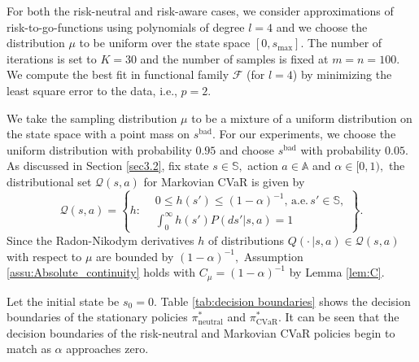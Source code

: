 \documentclass[12pt,technote,onecolumn]{IEEEtran}
\begin{document}
For both the risk-neutral and risk-aware cases, we consider approximations
of risk-to-go-functions using polynomials of degree $l=4$ and we
choose the distribution $\mu$ to be uniform over the state space
$\left[0,s_{\max}\right].$ The number of iterations is set to $K=30$
and the number of samples is fixed at $m=n=100.$ We compute the best
fit in functional family $\mathcal{F}$ (for
$l=4$) by minimizing the least square error to the data, i.e., $p=2.$

We take the sampling distribution $\mu$ to be a mixture of a uniform
distribution on the state space with a point mass on $s^{\text{bad}}$. For
our experiments, we choose the uniform distribution with probability
$0.95$ and choose $s^{\text{bad}}$ with probability $0.05$. As discussed
in Section \ref{sec3.2}, fix state $s\in\mathbb{S},$ action $a\in\mathbb{A}$
and $\alpha\in[0,1),$ the distributional set $\mathcal{Q}\left(s,a\right)$
for Markovian CVaR is given by
$$\mathcal{Q}(s,a)=\left\{h:\begin{aligned}&0\leq h\left(s'\right)\leq\left(1-\alpha\right)^{-1},\,\text{a.e.}\, s'\in\mathbb{S},\\&\int_{0}^{\infty}h\left(s'\right)P\left(ds'|s,a\right)=1\end{aligned}\right\}.$$ 
Since the Radon-Nikodym derivatives $h$ of distributions $Q\left(\cdot\,|s,a\right)\in\mathcal{Q}\left(s,a\right)$
with respect to $\mu$ are bounded by $\left(1-\alpha\right)^{-1},$
Assumption \ref{assu:Absolute_continuity} holds with $C_{\mu}=\left(1-\alpha\right)^{-1}$
by Lemma \ref{lem:C}.

Let the initial state be $s_{0}=0.$ Table \ref{tab:decision boundaries}
shows the decision boundaries of the stationary policies $\pi_{\text{neutral}}^{*}$
and $\pi_{\text{CVaR}}^{*}.$ It can be seen that the decision boundaries
of the risk-neutral and Markovian CVaR policies begin to match as
$\alpha$ approaches zero.
\end{document}
